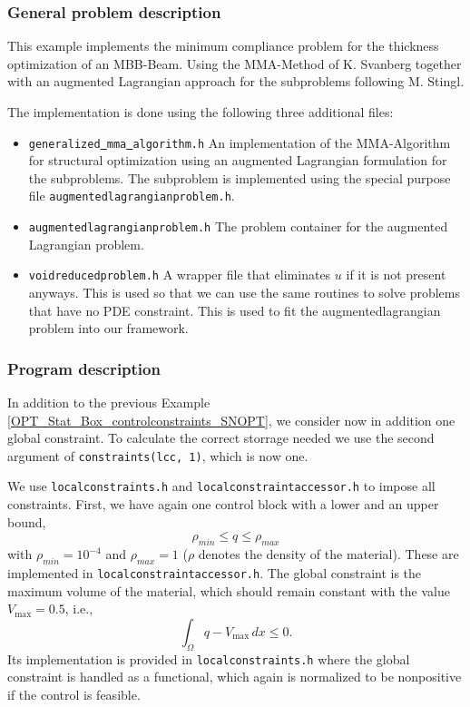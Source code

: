 \subsubsection{General problem description}
This example implements the minimum compliance problem for the thickness optimization 
of an MBB-Beam. Using the MMA-Method of K. Svanberg together with an augmented Lagrangian 
approach for the subproblems following M. Stingl.

The implementation is done using the following three additional files:

\begin{itemize}
\item \texttt{generalized\underline{ }mma\underline{ }algorithm.h}
  An implementation of the MMA-Algorithm for structural optimization using an augmented
  Lagrangian formulation for the subproblems. The subproblem is implemented using the 
  special purpose\\ file \texttt{augmentedlagrangianproblem.h}.
\item \texttt{augmentedlagrangianproblem.h} The problem container 
  for the augmented Lagrangian problem.
\item \texttt{voidreducedproblem.h} A wrapper file that eliminates $u$ 
  if it is not present anyways. This is used so that we can use the same routines to 
  solve problems that have no PDE constraint. This is used to fit the augmentedlagrangian 
  problem into our framework.
\end{itemize}


\subsubsection{Program description}
In addition to the previous Example \ref{OPT_Stat_Box_controlconstraints_SNOPT}, 
we consider now in addition one global constraint. To calculate the correct 
storrage needed we use the 
second argument of \texttt{constraints(lcc, 1)}, which is now one. 

We use 
\texttt{localconstraints.h} and \texttt{localconstraintaccessor.h} to impose 
all constraints. First, we have again one control block with a lower and 
an upper bound, 
\[
\rho_{min} \leq q \leq \rho_{max}
\]
with $\rho_{min} = 10^{-4}$ and $\rho_{max} = 1$ ($\rho$ denotes the density
of the material). These are implemented in \texttt{localconstraintaccessor.h}.
The global constraint is the maximum volume of the material,
which should remain constant with the value $V_{\max} = 0.5$, i.e.,
\[
 \int_\Omega q - V_{\max} \,dx \le 0.
\]
Its implementation is 
provided in \texttt{localconstraints.h} where the global constraint is handled as 
a functional, which again is normalized to be nonpositive if the control is feasible.

